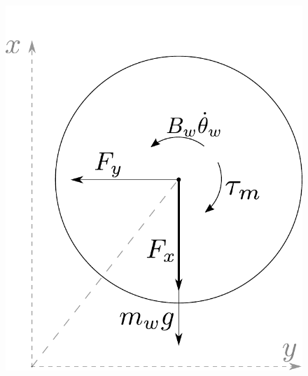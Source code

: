 \begin{minipage}{\linewidth}
\begin{minipage}{0.45\linewidth}
\begin{figure}[H]
  			\includegraphics[scale=.53]{figures/freeBodyWheel}
  			\centering
  			\captionsetup{justification=centering}
  			\label{freeBodyWheel}
  		\end{figure}\vspace{-5mm}
  	\end{minipage}
  \end{minipage}

